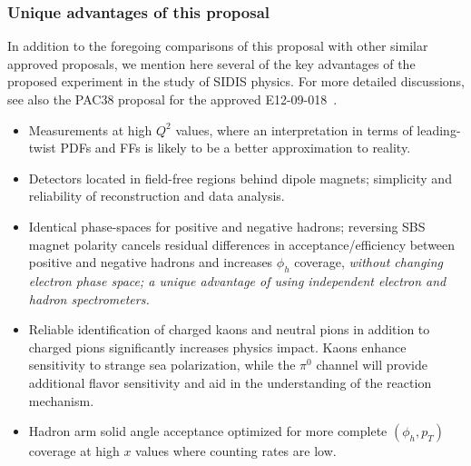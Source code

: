 \subsubsection{Unique advantages of this proposal}
In addition to the foregoing comparisons of this proposal with other similar approved proposals, we mention here several of the key advantages of the proposed experiment in the study of SIDIS physics. For more detailed discussions, see also the PAC38 proposal for the approved E12-09-018~\cite{SBS_SIDIS}.
\begin{itemize}
\item Measurements at high $Q^2$ values, where an interpretation in terms of leading-twist PDFs and FFs is likely to be a better approximation to reality.
\item Detectors located in field-free regions behind dipole magnets; simplicity and reliability of reconstruction and data analysis.
\item Identical phase-spaces for positive and negative hadrons; reversing SBS magnet polarity cancels residual differences in acceptance/efficiency between positive and negative hadrons and increases $\phi_h$ coverage, \emph{without changing electron phase space; a unique advantage of using independent electron and hadron spectrometers.}
\item Reliable identification of charged kaons and neutral pions in addition to charged pions significantly increases physics impact. Kaons enhance sensitivity to strange sea polarization, while the $\pi^0$ channel will provide additional flavor sensitivity and aid in the understanding of the reaction mechanism. 
\item Hadron arm solid angle acceptance optimized for more complete $(\phi_h,p_T)$ coverage at high $x$ values where counting rates are low.  
\end{itemize}
